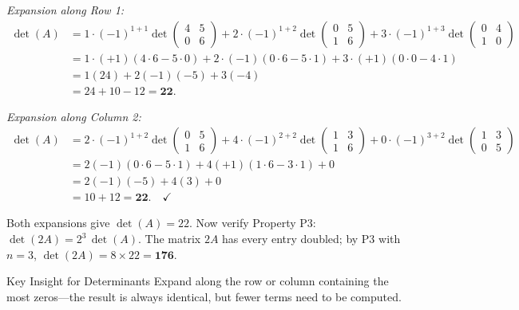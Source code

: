 \documentclass[12pt,a4paper]{article}
\begin{document}
\emph{Expansion along Row 1:}
\begin{align*}
\det(A) &= 1\cdot(-1)^{1+1}\det\begin{pmatrix}4&5\\0&6\end{pmatrix}
          +2\cdot(-1)^{1+2}\det\begin{pmatrix}0&5\\1&6\end{pmatrix}
          +3\cdot(-1)^{1+3}\det\begin{pmatrix}0&4\\1&0\end{pmatrix}\\
        &= 1\cdot(+1)(4\cdot6 - 5\cdot0)
          +2\cdot(-1)(0\cdot6 - 5\cdot1)
          +3\cdot(+1)(0\cdot0 - 4\cdot1)\\
        &= 1(24) + 2(-1)(-5) + 3(-4)\\
        &= 24 + 10 - 12 = \mathbf{22}.
\end{align*}

\emph{Expansion along Column 2:}
\begin{align*}
\det(A) &= 2\cdot(-1)^{1+2}\det\begin{pmatrix}0&5\\1&6\end{pmatrix}
          +4\cdot(-1)^{2+2}\det\begin{pmatrix}1&3\\1&6\end{pmatrix}
          +0\cdot(-1)^{3+2}\det\begin{pmatrix}1&3\\0&5\end{pmatrix}\\
        &= 2(-1)(0\cdot6-5\cdot1)
          +4(+1)(1\cdot6-3\cdot1)
          +0\\
        &= 2(-1)(-5) + 4(3) + 0\\
        &= 10 + 12 = \mathbf{22}.\quad\checkmark
\end{align*}

Both expansions give $\det(A) = 22$. Now verify Property P3: $\det(2A) = 2^3\,\det(A)$.
The matrix $2A$ has every entry doubled; by P3 with $n=3$, $\det(2A) = 8\times22 = \mathbf{176}$.

\begin{learnbox}{Key Insight for Determinants}
Expand along the row or column containing the most zeros---the result is always identical, but fewer terms need to be computed.
\end{learnbox}
\end{document}

